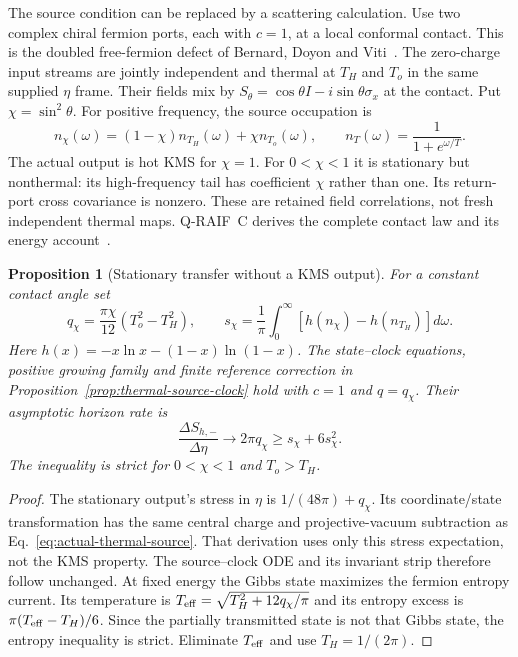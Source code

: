 \documentclass[12pt,a4paper]{article}
\newtheorem{proposition}[theorem]{Proposition}
\begin{document}
The source condition can be replaced by a scattering calculation. Use
two complex chiral fermion ports, each with $c=1$, at a local conformal
contact. This is the doubled free-fermion defect of
Bernard, Doyon and Viti~\cite[Sections~3 and 5]{BernardDoyonViti2015}.
The zero-charge input streams are jointly independent and thermal at
$T_H$ and $T_o$ in the same supplied $\eta$ frame. Their fields mix by
$S_\theta=\cos\theta I-i\sin\theta\sigma_x$ at the contact. Put
$\chi=\sin^2\theta$. For positive frequency, the source occupation is
\begin{equation}\label{eq:local-source-occupation}
 n_\chi(\omega)=(1-\chi)n_{T_H}(\omega)+\chi n_{T_o}(\omega),\qquad
 n_T(\omega)=\frac1{1+e^{\omega/T}}.
\end{equation}
The actual output is hot KMS for $\chi=1$. For $0<\chi<1$ it is
stationary but nonthermal: its high-frequency tail has coefficient
$\chi$ rather than one. Its return-port cross covariance is nonzero.
These are retained field correlations, not fresh independent thermal
maps. Q-RAIF~C derives the complete contact law and its energy
account~\cite[Section on a local thermal contact]{QRC}.

\begin{proposition}[Stationary transfer without a KMS output]
\label{prop:nonthermal-source-clock}
For a constant contact angle set
\begin{equation}\label{eq:local-source-charge}
 q_\chi=\frac{\pi\chi}{12}(T_o^2-T_H^2),\qquad
 s_\chi=\frac1\pi\int_0^\infty
       [h(n_\chi)-h(n_{T_H})]d\omega.
\end{equation}
Here $h(x)=-x\ln x-(1-x)\ln(1-x)$.
The state--clock equations, positive growing family and finite reference
correction in Proposition~\ref{prop:thermal-source-clock} hold with
$c=1$ and $q=q_\chi$. Their asymptotic horizon rate is
\begin{equation}\label{eq:nonthermal-horizon-rate}
 \frac{\Delta S_{h,-}}{\Delta\eta}\longrightarrow2\pi q_\chi
       \ge s_\chi+6s_\chi^2.
\end{equation}
The inequality is strict for $0<\chi<1$ and $T_o>T_H$.
\end{proposition}
\begin{proof}
The stationary output's stress in $\eta$ is
$1/(48\pi)+q_\chi$. Its coordinate/state transformation has the same
central charge and projective-vacuum subtraction as
Eq.~\eqref{eq:actual-thermal-source}. That derivation uses only this
stress expectation, not the KMS property. The source--clock ODE and
its invariant strip therefore follow unchanged. At fixed energy the
Gibbs state maximizes the fermion entropy current. Its temperature is
$T_{\rm eff}=\sqrt{T_H^2+12q_\chi/\pi}$ and its entropy excess is
$\pi(T_{\rm eff}-T_H)/6$. Since the partially transmitted state is not
that Gibbs state, the entropy inequality is strict. Eliminate
$T_{\rm eff}$ and use $T_H=1/(2\pi)$.
\end{proof}
\end{document}
